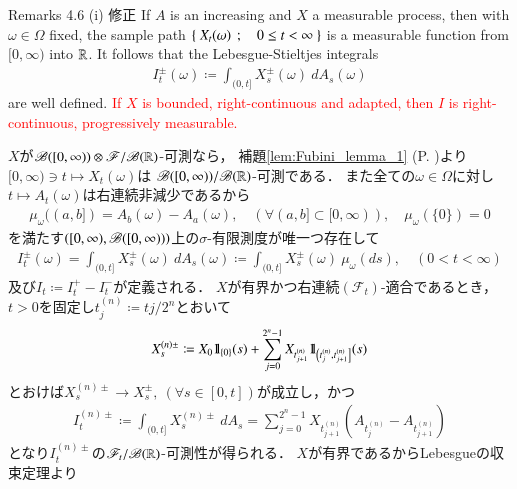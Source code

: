 	\begin{itembox}[l]{Remarks 4.6 (i) 修正}
		If $A$ is an increasing and $X$ a measurable process, then with $\omega \in \Omega$ fixed,
		the sample path $\left\{\ X_t(\omega)\ \, ; \quad 0 \leq t < \infty\ \right\}$ is a measurable function from $[0,\infty)$
		into $\mathbb{R}$. It follows that the Lebesgue-Stieltjes integrals
		\begin{align}
			I^{\pm}_t(\omega) \coloneqq
			\int_{(0,t]} X^\pm_s(\omega)\ dA_s(\omega)
		\end{align}
		are well defined. \textcolor{red}{If $X$ is bounded, right-continuous and adapted, 
		then $I$ is right-continuous, progressively measurable.}
	\end{itembox}
	
	\begin{prf}
		$X$が$\mathscr{B}([0,\infty)) \otimes \mathscr{F}/\mathscr{B}(\mathbb{R})$-可測なら，
		補題\ref{lem:Fubini_lemma_1} (P. \pageref{lem:Fubini_lemma_1})より
		$[0,\infty) \ni t \longmapsto X_t(\omega)$は
		$\mathscr{B}([0,\infty))/\mathscr{B}(\mathbb{R})$-可測である．
		また全ての$\omega \in \Omega$に対し$t \longmapsto A_t(\omega)$は右連続非減少であるから
		\begin{align}
			\mu_\omega((a,b]) = A_b(\omega) - A_a(\omega),
			\quad (\forall (a,b] \subset [0,\infty)),
			\quad \mu_\omega(\{0\}) = 0
		\end{align}
		を満たす$\left([0,\infty),\mathscr{B}([0,\infty))\right)$上の$\sigma$-有限測度が唯一つ存在して
		\begin{align}
			I^\pm_t(\omega) = \int_{(0,t]} X^\pm_s(\omega)\ dA_s(\omega)
			\coloneqq \int_{(0,t]} X^\pm_s(\omega)\ \mu_\omega(ds),
			\quad (0 < t < \infty)
		\end{align}
		及び$I_t \coloneqq I^+_t - I^-_t$が定義される．
		$X$が有界かつ右連続$(\mathscr{F}_t)$-適合であるとき，
		$t>0$を固定し$t^{(n)}_j \coloneqq tj/2^n$とおいて
		\begin{align}
			X^{(n)\pm}_s \coloneqq X_0 \mbox{1}\hspace{-0.25em}\mbox{l}_{\{0\}}(s) + 
				\sum_{j=0}^{2^n-1} X_{t^{(n)}_{j+1}} 
				\mbox{1}\hspace{-0.25em}\mbox{l}_{\left(t^{(n)}_j,t^{(n)}_{j+1}\right]}(s)
		\end{align}
		とおけば$X^{(n)\pm}_s \longrightarrow X^\pm_s,\ (\forall s \in [0,t])$が成立し，かつ
		\begin{align}
			I^{(n)\pm}_t \coloneqq \int_{(0,t]} X^{(n)\pm}_s\ dA_s
			= \sum_{j=0}^{2^n-1} X_{t^{(n)}_{j+1}} \left(A_{t^{(n)}_j} - A_{t^{(n)}_{j+1}}\right)
		\end{align}
		となり$I^{(n)\pm}_t$の$\mathscr{F}_t/\mathscr{B}(\mathbb{R})$-可測性が得られる．
		$X$が有界であるからLebesgueの収束定理より

\end{prf}
